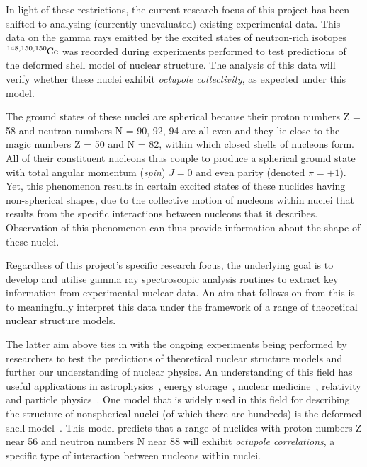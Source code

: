 \documentclass[12pt,a4paper]{article}
\begin{document}
\medskip
\noindent
In light of these restrictions, the current research focus of this project has been shifted to analysing (currently unevaluated) existing experimental data.
This data on the gamma rays emitted by the excited states of neutron-rich isotopes $\ce{^{148,150,150}Ce}$ was recorded during experiments performed to test predictions of the deformed shell model of nuclear structure.
The analysis of this data will verify whether these nuclei exhibit \textit{octupole collectivity}, as expected under this model.

\medskip
\noindent
The ground states of these nuclei are spherical because their proton numbers Z = 58 and neutron numbers N = 90, 92, 94 are all even and they lie close to the magic numbers Z = 50 and N = 82, within which closed shells of nucleons form.
All of their constituent nucleons thus couple to produce a spherical ground state with total angular momentum (\textit{spin}) $J = 0$ and even parity (denoted $\pi = +1$).
Yet, this phenomenon results in certain excited states of these nuclides having non-spherical shapes, due to the collective motion of nucleons within nuclei that results from the specific interactions between nucleons that it describes.
Observation of this phenomenon can thus provide information about the shape of these nuclei.

\medskip
\noindent
Regardless of this project's specific research focus, the underlying goal is to develop and utilise gamma ray spectroscopic analysis routines to extract key information from experimental nuclear data.
An aim that follows on from this is to meaningfully interpret this data under the framework of a range of theoretical nuclear structure models.

\medskip
\noindent
The latter aim above ties in with the ongoing experiments being performed by researchers to test the predictions of theoretical nuclear structure models and further our understanding of nuclear physics.
An understanding of this field has useful applications in astrophysics~\cite{hayakawa_neutron_2009}, energy storage~\cite{shaffer_innovations_2018}, nuclear medicine~\cite{krane_introductory_1987}, relativity and particle physics~\cite{casten_nuclear_1990}.
One model that is widely used in this field for describing the structure  of nonspherical nuclei (of which there are hundreds) is the deformed shell model~\cite{casten_nuclear_1990}.
This model predicts that a range of nuclides with proton numbers Z near 56 and neutron numbers N near 88 will exhibit \textit{octupole correlations}, a specific type of interaction between nucleons within nuclei.
\end{document}
